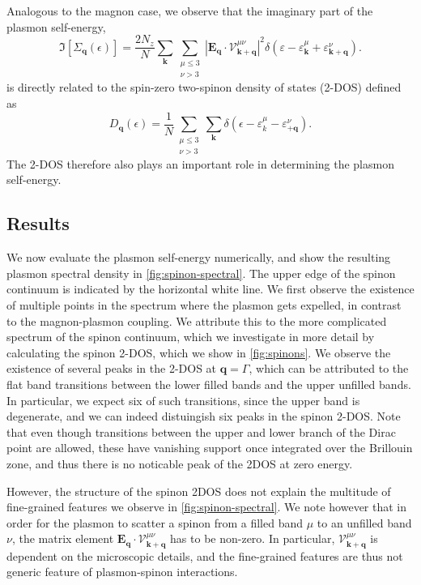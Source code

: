 Analogous to the magnon case, we observe that the imaginary part of the plasmon self-energy,
\begin{equation}
	\Im[\Sigma_{\bm q}(\epsilon)] = \frac{2N_z}{N}\sum_{\bm k}\sum_{\substack{\mu\leq3\\\nu>3}} {|\bm E_{\bm q}\cdot\bm{\mathcal V}_{\bm k+\bm q}^{\mu\nu}|^2}\delta({\varepsilon -\varepsilon^\mu_{\bm k} + \varepsilon^{\nu}_{\bm k+\bm q}}). 
\end{equation}
is directly related to the spin-zero two-spinon density of states (2-DOS) defined as
\begin{equation}
	D_{\bm q}(\epsilon)= \frac1N \sum_{\substack{\mu\leq3\\\nu>3}}\sum_{\bm k} \delta (\epsilon - \varepsilon^\mu_k - \varepsilon^{\nu}_{\bm + \bm q}).
\end{equation}
The 2-DOS therefore also plays an important role in determining the plasmon self-energy. 

\subsection{Results}
We now evaluate the plasmon self-energy numerically, and show the resulting plasmon spectral density in  \cref{fig:spinon-spectral}. The upper edge of the spinon continuum is indicated by the horizontal white line. 
We first observe the existence of multiple points in the spectrum where the plasmon gets expelled, in contrast to the magnon-plasmon coupling. We attribute this to the more complicated spectrum of the spinon continuum, which we investigate in more detail by calculating the spinon 2-DOS, which we show in \cref{fig:spinons}. We observe the existence of several peaks in the 2-DOS at $\bm q=\Gamma$, which can be attributed to the flat band transitions between the lower filled bands and the upper unfilled bands. In particular, we expect six of such transitions, since the upper band is degenerate, and we can indeed distuingish six peaks in the spinon 2-DOS. Note that even though transitions between the upper and lower branch of the Dirac point are allowed, these have vanishing support once integrated over the Brillouin zone, and thus there is no noticable peak of the 2DOS at zero energy. 

However, the structure of the spinon 2DOS does not explain the multitude of fine-grained features we observe in \cref{fig:spinon-spectral}. We note however that in order for the plasmon to scatter a spinon from a filled band $\mu$ to an unfilled band $\nu$, the matrix element $\bm E_{\bm q}\cdot \mathcal V_{\bm k + \bm q}^{\mu\nu}$ has to be non-zero. In particular, $\mathcal V_{\bm k + \bm q}^{\mu\nu}$ is dependent on the microscopic details, and the fine-grained features are thus not generic feature of plasmon-spinon interactions.

